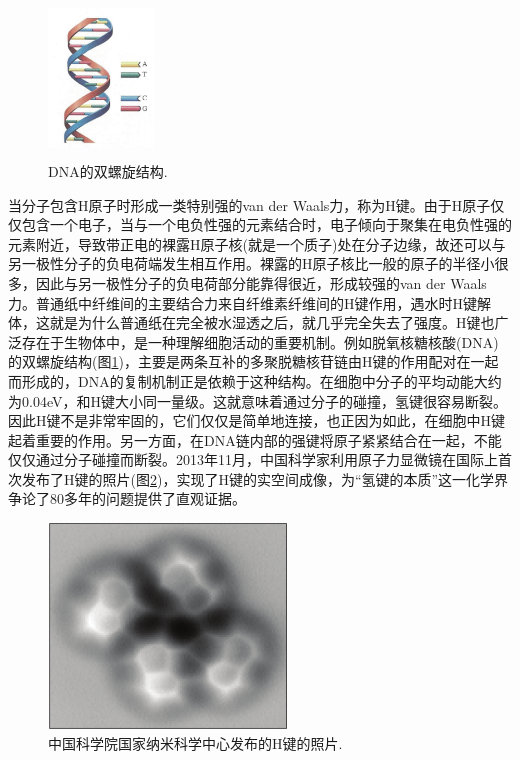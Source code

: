 \begin{figure}[h!]
\centering
\vspace*{-0.1in}
\includegraphics[height=1.65in,width=1.1in,viewport=0 0 50 60,clip]{Figures/Double_helix-structure-DNA.png}
\caption{\small \textrm{DNA的双螺旋结构.}}%
\label{Fig:DNA}
\end{figure}
当分子包含H原子时形成一类特别强的van der Waals力，称为H键。由于H原子仅仅包含一个电子，当与一个电负性强的元素结合时，电子倾向于聚集在电负性强的元素附近，导致带正电的裸露H原子核(就是一个质子)处在分子边缘，故还可以与另一极性分子的负电荷端发生相互作用。裸露的H原子核比一般的原子的半径小很多，因此与另一极性分子的负电荷部分能靠得很近，形成较强的van der Waals力。普通纸中纤维间的主要结合力来自纤维素纤维间的H键作用，遇水时H键解体，这就是为什么普通纸在完全被水湿透之后，就几乎完全失去了强度。H键也广泛存在于生物体中，是一种理解细胞活动的重要机制。例如脱氧核糖核酸(DNA)的双螺旋结构(图\ref{Fig:DNA})，主要是两条互补的多聚脱糖核苷链由H键的作用配对在一起而形成的，DNA的复制机制正是依赖于这种结构。在细胞中分子的平均动能大约为0.04eV，和H键大小同一量级。这就意味着通过分子的碰撞，氢键很容易断裂。因此H键不是非常牢固的，它们仅仅是简单地连接，也正因为如此，在细胞中H键起着重要的作用。另一方面，在DNA链内部的强键将原子紧紧结合在一起，不能仅仅通过分子碰撞而断裂。2013年11月，中国科学家利用原子力显微镜在国际上首次发布了H键的照片(图\ref{Fig:H-bond})，实现了H键的实空间成像，为``氢键的本质''这一化学界争论了80多年的问题提供了直观证据。
\begin{figure}[h!]
\centering
\vspace*{-0.1in}
\includegraphics[height=2.15in,width=2.5in,viewport=0 0 840 730,clip]{Figures/Image-of-H_bond.png}
\caption{\small \textrm{中国科学院国家纳米科学中心发布的H键的照片.}}%
\label{Fig:H-bond}
\end{figure}

